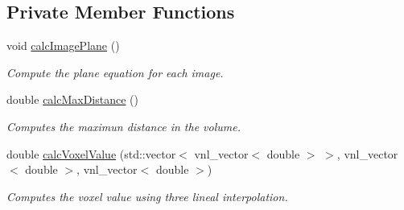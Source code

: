 \subsection*{Private Member Functions}
\begin{DoxyCompactItemize}
\item 
void \hyperlink{class_volume_reconstruction_a35f8f4ee0dacf37cfbcfc8f827f240e2}{calc\-Image\-Plane} ()
\begin{DoxyCompactList}\small\item\em Compute the plane equation for each image. \end{DoxyCompactList}\item 
double \hyperlink{class_volume_reconstruction_a56c2752963605f4f3946f993b965896b}{calc\-Max\-Distance} ()
\begin{DoxyCompactList}\small\item\em Computes the maximun distance in the volume. \end{DoxyCompactList}\item 
double \hyperlink{class_volume_reconstruction_a6a8f5b24210f1c991c62b3cd988b7ed4}{calc\-Voxel\-Value} (std\-::vector$<$ vnl\-\_\-vector$<$ double $>$ $>$, vnl\-\_\-vector$<$ double $>$, vnl\-\_\-vector$<$ double $>$)
\begin{DoxyCompactList}\small\item\em Computes the voxel value using three lineal interpolation. \end{DoxyCompactList}\end{DoxyCompactItemize}
